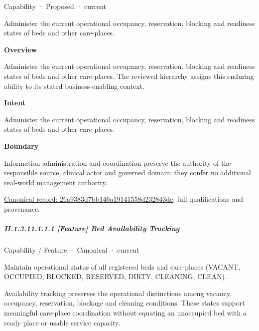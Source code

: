 \label{element:26a9383d7bb146a19141558d232843de}
{\small Capability · Proposed · current}\par

Administer the current operational occupancy, reservation, blocking and readiness states of beds and other care-places.



\textbf{Overview}



Administer the current operational occupancy, reservation, blocking and readiness states of beds and other care-places. The reviewed hierarchy assigns this enduring ability to its stated business-enabling context.



\textbf{Intent}



Administer the current operational occupancy, reservation, blocking and readiness states of beds and other care-places.



\textbf{Boundary}



Information administration and coordination preserve the authority of the responsible source, clinical actor and governed domain; they confer no additional real-world management authority.


{\footnotesize \href{../../../../continuum/strategy/capability/26a9383d7bb146a19141558d232843de.md}{Canonical record: 26a9383d7bb146a19141558d232843de}; full qualifications and provenance.}\par
\subparagraph*{II.1.3.11.1.1.1 [Feature] Bed Availability Tracking}
\label{navigation:II.1.3.11.1.1.1}

\label{element:7c61f21e558c44ab92c267a781116d1d}
{\small Capability / Feature · Canonical · current}\par

Maintain operational status of all registered beds and care-places (VACANT, OCCUPIED, BLOCKED, RESERVED, DIRTY, CLEANING, CLEAN).



Availability tracking preserves the operational distinctions among vacancy, occupancy, reservation, blockage and cleaning conditions. These states support meaningful care-place coordination without equating an unoccupied bed with a ready place or usable service capacity.


